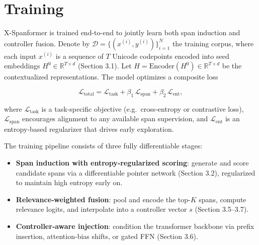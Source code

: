 \section{Training}

X-Spanformer is trained end-to-end to jointly learn both span induction and controller fusion.  Denote by 
\(\mathcal{D}=\{(x^{(i)},y^{(i)})\}_{i=1}^N\) 
the training corpus, where each input \(x^{(i)}\) is a sequence of \(T\) Unicode codepoints encoded into seed embeddings \(H^0\in\mathbb{R}^{T\times d}\) (Section 3.1).  Let \(H=\mathrm{Encoder}(H^0)\in\mathbb{R}^{T\times d}\) be the contextualized representations.  The model optimizes a composite loss

\[
\mathcal{L}_{\mathrm{total}}
= \mathcal{L}_{\mathrm{task}}
+ \beta_1\,\mathcal{L}_{\mathrm{span}}
+ \beta_2\,\mathcal{L}_{\mathrm{ent}},
\]

where
\(\mathcal{L}_{\mathrm{task}}\) is a task‐specific objective (e.g.\ cross‐entropy or contrastive loss),
\(\mathcal{L}_{\mathrm{span}}\) encourages alignment to any available span supervision, and
\(\mathcal{L}_{\mathrm{ent}}\) is an entropy‐based regularizer that drives early exploration.

The training pipeline consists of three fully differentiable stages:
\begin{itemize}
	\item \textbf{Span induction with entropy‐regularized scoring}: generate and score candidate spans via a differentiable pointer network (Section 3.2), regularized to maintain high entropy early on.
	\item \textbf{Relevance‐weighted fusion}: pool and encode the top-\(K\) spans, compute relevance logits, and interpolate into a controller vector \(s\) (Section 3.5–3.7).
	\item \textbf{Controller‐aware injection}: condition the transformer backbone via prefix insertion, attention‐bias shifts, or gated FFN (Section 3.6).
\end{itemize}




